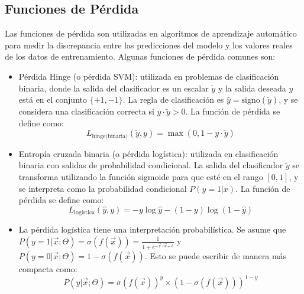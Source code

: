 

\subsection{Funciones de Pérdida}
Las funciones de pérdida son utilizadas en algoritmos de aprendizaje automático para medir la discrepancia entre las predicciones del modelo y los valores reales de los datos de entrenamiento. Algunas funciones de pérdida comunes son:

\begin{itemize}
 \item Pérdida Hinge (o pérdida SVM): utilizada en problemas de clasificación binaria, donde la salida del clasificador es un escalar $\tilde{y}$ y la salida deseada $y$ está en el conjunto $\{+1,-1\}$. La regla de clasificación es $\hat{y} = \text{signo}(\tilde{y})$, y se considera una clasificación correcta si $y \cdot \tilde{y} > 0$. La función de pérdida se define como:
 \begin{displaymath}
  L_{\text{hinge(binaria)}}(\tilde{y},y) = \max(0,1-y \cdot \tilde{y})
 \end{displaymath}

 \item Entropía cruzada binaria (o pérdida logística): utilizada en clasificación binaria con salidas de probabilidad condicional. La salida del clasificador $\tilde{y}$ se transforma utilizando la función sigmoide para que esté en el rango $[0,1]$, y se interpreta como la probabilidad condicional $P(y=1|x)$. La función de pérdida se define como:
  \begin{displaymath}
  L_{\text{logística}}(\hat{y},y) = -y \log \hat{y} - (1-y) \log(1-\hat{y})
 \end{displaymath}

 \item La pérdida logística tiene una interpretación probabilística. Se asume que $P(y =1 | \vec{x} ; \Theta) = \sigma(f(\vec{x})) = \frac{1}{1+e^{-\vec{x}\cdot \vec{w}+b}}$ y $P(y = 0 | \vec{x} ; \Theta) = 1 - \sigma(f(\vec{x}))$. Esto se puede escribir de manera más compacta como:
 \begin{displaymath}
  P(y | \vec{x} ; \Theta) = \sigma(f(\vec{x}))^y\times(1-\sigma(f(\vec{x})))^{1-y}
 \end{displaymath}


\end{itemize}
